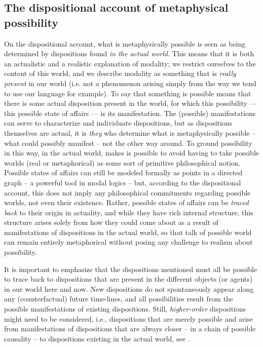 \documentclass{article}
\begin{document}
\subsection*{The dispositional account of metaphysical possibility}

On the dispositional account, what is metaphysically possible is seen as being determined by dispositions found \emph{in the actual world}. This means that it is both an actualistic and a realistic explanation of modality; we restrict ourselves to the content of this world, and we describe modality as something that is \emph{really present} in our world (i.e. not a phenomenon arising simply from the way we tend to use our language for example). To say that something is possible means that there is some actual disposition present in the world, for which this possibility --- this possible state of affairs --- is its manifestation. The (possible) manifestations can serve to characterize and individuate dispositions, but as dispositions themselves are actual, it is \emph{they} who determine what is metaphysically possible -- what could possibly manifest -- not the other way around. To ground possibility in this way, in the actual world, makes is possible to avoid having to take possible worlds (real or metaphorical) as some sort of primitive philosophical notion. Possible states of affairs can still be modeled formally as points in a directed graph -- a powerful tool in modal logics -- but, according to the dispositional account, this does not imply any philosophical commitments regarding possible worlds, not even their existence. Rather, possible states of affairs can be \emph{traced back} to their origin in actuality, and while they have rich internal structure, this structure arises solely from how they could come about as a result of manifestations of dispositions in the actual world, so that talk of possible world can remain entirely metaphorical without posing any challenge to realism about possibility.

It is important to emphasize that the dispositions mentioned must all be possible to trace back to dispositions that are present in the different objects (or agents) in our world here and now. New dispositions do not spontaneously appear along any (counterfactual) future time-lines, and all possibilities result from the possible manifestations of existing dispositions. Still, \emph{higher-order} dispositions might need to be considered, i.e., dispositions that are merely possible and arise from manifestations of dispositions that are always closer -- in a chain of possible causality -- to dispositions existing in the actual world, see \cite{....}.
\end{document}
